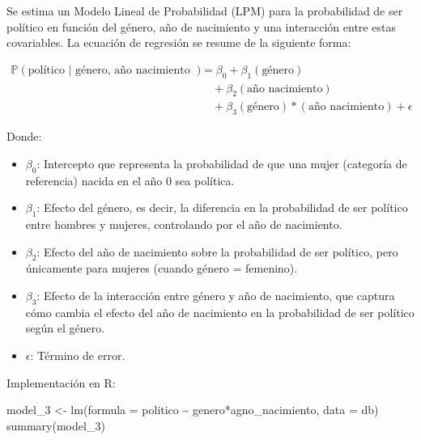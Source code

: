\documentclass[
  12pt,
  a4paper,
]{article}
\newenvironment{Shaded}{\begin{snugshade}}{\end{snugshade}}
\newcommand{\AttributeTok}[1]{\textcolor[rgb]{0.77,0.63,0.00}{#1}}
\newcommand{\FunctionTok}[1]{\textcolor[rgb]{0.00,0.00,0.00}{#1}}
\newcommand{\NormalTok}[1]{#1}
\newcommand{\OtherTok}[1]{\textcolor[rgb]{0.56,0.35,0.01}{#1}}
\newcommand{\SpecialCharTok}[1]{\textcolor[rgb]{0.00,0.00,0.00}{#1}}
\providecommand{\tightlist}{%
  \setlength{\itemsep}{0pt}\setlength{\parskip}{0pt}}
\begin{document}
Se estima un Modelo Lineal de Probabilidad (LPM) para la probabilidad de ser político en función del género, año de nacimiento y una interacción entre estas covariables. La ecuación de regresión se resume de la siguiente forma:

\[
\begin{aligned}
\mathbb{P}(\text{político | género, año nacimiento }) &= \beta_{0} + \beta_{1}(\text{género}) \\
&\quad + \beta_{2}(\text{año nacimiento}) \\
&\quad + \beta_{3}(\text{género})*(\text{año nacimiento}) + \epsilon
\end{aligned}
\]

Donde:

\begin{itemize}
\tightlist
\item
  \(\beta_{0}\): Intercepto que representa la probabilidad de que una mujer (categoría de referencia) nacida en el año 0 sea política.
\item
  \(\beta_{1}\): Efecto del género, es decir, la diferencia en la probabilidad de ser político entre hombres y mujeres, controlando por el año de nacimiento.
\item
  \(\beta_{2}\): Efecto del año de nacimiento sobre la probabilidad de ser político, pero únicamente para mujeres (cuando género = femenino).
\item
  \(\beta_{3}\): Efecto de la interacción entre género y año de nacimiento, que captura cómo cambia el efecto del año de nacimiento en la probabilidad de ser político según el género.
\item
  \(\epsilon\): Término de error.
\end{itemize}

Implementación en R:

\begin{Shaded}
\begin{Highlighting}[]
\NormalTok{model\_3 }\OtherTok{\textless{}{-}} \FunctionTok{lm}\NormalTok{(}\AttributeTok{formula =}\NormalTok{ politico }\SpecialCharTok{\textasciitilde{}}\NormalTok{ genero}\SpecialCharTok{*}\NormalTok{agno\_nacimiento, }
              \AttributeTok{data =}\NormalTok{ db)}
\FunctionTok{summary}\NormalTok{(model\_3)}
\end{Highlighting}
\end{Shaded}
\end{document}

